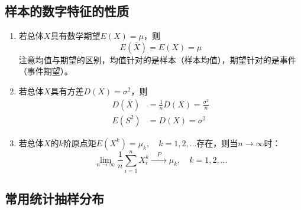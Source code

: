 \subsection{样本的数字特征的性质}
\begin{enumerate}
	\item 若总体$X$具有数学期望$E(X)=\mu$，则
	\begin{equation}
		E(\bar X) = E(X) = \mu
	\end{equation}
	注意均值与期望的区别，均值针对的是样本（样本均值），期望针对的是事件（事件期望）。
	\item 若总体$X$具有方差$D(X)=\sigma^2$，则
	\begin{align}
		D(\bar X) &= \frac{1}{n}D(X) = \frac{\sigma^2}{n} \\
		E(S^2) &= D(X) = \sigma^2
	\end{align}
	\item 若总体$X$的$k$阶原点矩$E(X^k) = \mu_k, \quad k = 1, 2, \dots$存在，则当$n \to \infty$时：
	\begin{equation}
		\lim_{n\to \infty} \frac{1}{n}\sum_{i=1}^{n}X_i^k \xrightarrow{\quad P \quad} \mu_k, \quad k = 1, 2, \dots
	\end{equation}
\end{enumerate}

\subsection{常用统计抽样分布}
